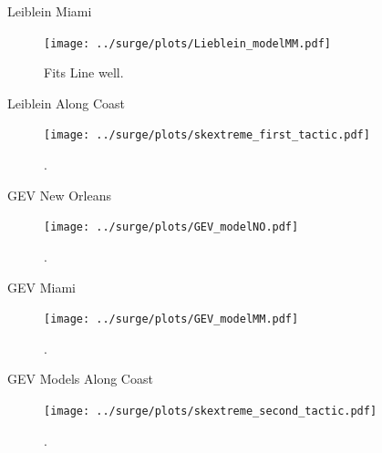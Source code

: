 \begin{frame}{Leiblein Miami}
\vspace{-20pt}
 \begin{minipage}{1.0\textwidth}
\begin{figure}[htb!]
    \centering
    \texttt{[image: ../surge/plots/Lieblein\_modelMM.pdf]}
    \vspace{-15pt}
   \caption{Fits Line well. }
    \label{fig:}
\end{figure}
\end{minipage}
\end{frame}


\begin{frame}{Leiblein Along Coast}
\vspace{-20pt}
 \begin{minipage}{1.0\textwidth}
\begin{figure}[htb!]
    \centering
    \texttt{[image: ../surge/plots/skextreme\_first\_tactic.pdf]}
    \vspace{-15pt}
   \caption{. }
    \label{fig:}
\end{figure}
\end{minipage}
\end{frame}


\begin{frame}{GEV New Orleans}
\vspace{-20pt}
 \begin{minipage}{1.0\textwidth}
\begin{figure}[htb!]
    \centering
    \texttt{[image: ../surge/plots/GEV\_modelNO.pdf]}
    \vspace{-15pt}
   \caption{. }
    \label{fig:}
\end{figure}
\end{minipage}
\end{frame}

\begin{frame}{GEV Miami}
\vspace{-20pt}
 \begin{minipage}{1.0\textwidth}
\begin{figure}[htb!]
    \centering
    \texttt{[image: ../surge/plots/GEV\_modelMM.pdf]}
    \vspace{-15pt}
   \caption{. }
    \label{fig:}
\end{figure}
\end{minipage}
\end{frame}

\begin{frame}{GEV Models Along Coast}
\vspace{-20pt}
 \begin{minipage}{1.0\textwidth}
\begin{figure}[htb!]
    \centering
    \texttt{[image: ../surge/plots/skextreme\_second\_tactic.pdf]}
    \vspace{-15pt}
   \caption{. }
    \label{fig:}
\end{figure}
\end{minipage}
\end{frame}


